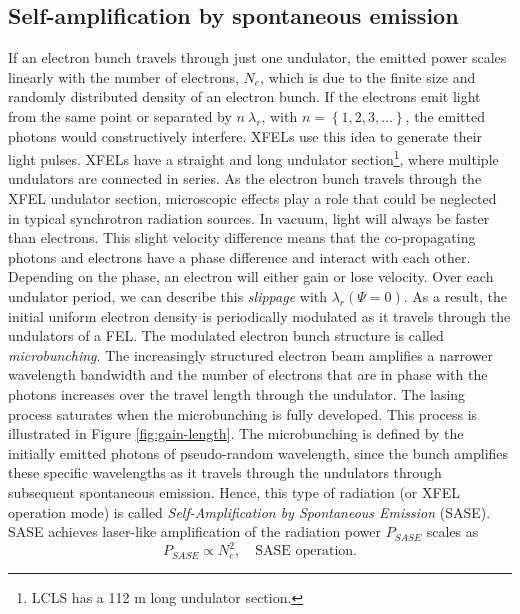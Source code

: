 \subsection{Self-amplification by spontaneous emission}\label{sec:sase}
If an electron bunch travels through just one undulator, the emitted power scales linearly with the number of electrons, $N_{e}$, which is due to the finite size and randomly distributed density of an electron bunch. If the electrons emit light from the same point or separated by $n\ \lambda_{r}$, with $n=\left\{1,2,3,...\right\}$, the emitted photons would constructively interfere. XFELs use this idea to generate their light pulses. XFELs have a straight and long undulator section\footnote{LCLS has a 112 m long undulator section.}, where multiple undulators are connected in series. As the electron bunch travels through the XFEL undulator section, microscopic effects play a role that could be neglected in typical synchrotron radiation sources. In vacuum, light will always be faster than electrons. This slight velocity difference means that the co-propagating photons and electrons have a phase difference and interact with each other. Depending on the phase, an electron will either gain or lose velocity. Over each undulator period, we can describe this \textit{slippage} with $\lambda_{r}(\Psi = 0)$. As a result, the initial uniform electron density is periodically modulated as it travels through the undulators of a FEL. The modulated electron bunch structure is called \textit{microbunching}. The increasingly structured electron beam amplifies a narrower wavelength bandwidth and the number of electrons that are in phase with the photons increases over the travel length through the undulator. The lasing process saturates when the microbunching is fully developed. This process is illustrated in Figure \ref{fig:gain-length}.
The microbunching is defined by the initially emitted photons of pseudo-random wavelength, since the bunch amplifies these specific wavelengths as it travels through the undulators through subsequent spontaneous emission.
Hence, this type of radiation (or XFEL operation mode) is called \textit{Self-Amplification by Spontaneous Emission} (SASE). SASE achieves laser-like amplification of the radiation power $P_{SASE}$ scales as \citep[see][p.~61]{Als-Nielson-2011-JWS}
\begin{equation}
P_{SASE} \propto N_{e}^{2},\quad \text{SASE operation.}
\end{equation}
